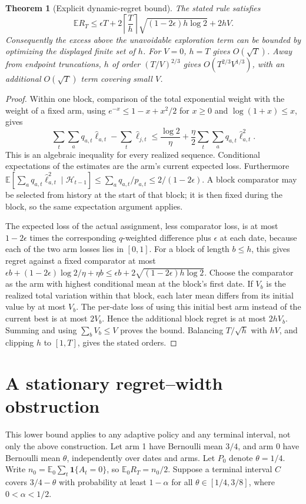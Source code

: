 \documentclass[11pt]{article}
\newtheorem{theorem}{Theorem}
\theoremstyle{remark}\newtheorem{remark}[theorem]{Remark}
\newcommand{\E}{\mathbb E}
\newcommand{\ind}{\mathbf 1}
\begin{document}
\begin{theorem}[Explicit dynamic-regret bound]
The stated rule satisfies
\[
 \E R_T\le\epsilon T+
 2\left\lceil\frac Th\right\rceil\sqrt{(1-2\epsilon)h\log2}
 +2hV.
\]
Consequently the excess above the unavoidable exploration term can be bounded by optimizing the displayed finite set of $h$. For $V=0$, $h=T$ gives $O(\sqrt T)$. Away from endpoint truncations, $h$ of order $(T/V)^{2/3}$ gives $O(T^{2/3}V^{1/3})$, with an additional $O(\sqrt T)$ term covering small $V$.
\end{theorem}
\begin{proof}
Within one block, comparison of the total exponential weight with the weight of a fixed arm, using $e^{-x}\le1-x+x^2/2$ for $x\ge0$ and $\log(1+x)\le x$, gives
\[
 \sum_t\sum_a q_{a,t}\widehat\ell_{a,t}
 -\sum_t\widehat\ell_{j,t}
 \le\frac{\log2}{\eta}
 +\frac\eta2\sum_t\sum_aq_{a,t}\widehat\ell_{a,t}^2.
\]
This is an algebraic inequality for every realized sequence. Conditional expectations of the estimates are the arm's current expected loss. Furthermore
$\E[\sum_aq_{a,t}\widehat\ell_{a,t}^2\mid\mathcal H_{t-1}]
\le\sum_aq_{a,t}/p_{a,t}\le2/(1-2\epsilon)$.
A block comparator may be selected from history at the start of that block; it is then fixed during the block, so the same expectation argument applies.

The expected loss of the actual assignment, less comparator loss, is at most $1-2\epsilon$ times the corresponding $q$-weighted difference plus $\epsilon$ at each date, because each of the two arm losses lies in $[0,1]$. For a block of length $b\le h$, this gives regret against a fixed comparator at most
$\epsilon b+(1-2\epsilon)\log2/\eta+\eta b
\le\epsilon b+2\sqrt{(1-2\epsilon)h\log2}$.
Choose the comparator as the arm with highest conditional mean at the block's first date. If $V_b$ is the realized total variation within that block, each later mean differs from its initial value by at most $V_b$. The per-date loss of using this initial best arm instead of the current best is at most $2V_b$. Hence the additional block regret is at most $2hV_b$. Summing and using $\sum_bV_b\le V$ proves the bound. Balancing $T/\sqrt h$ with $hV$, and clipping $h$ to $[1,T]$, gives the stated orders.
\end{proof}

\section*{A stationary regret--width obstruction}
This lower bound applies to any adaptive policy and any terminal interval, not only the above construction. Let arm 1 have Bernoulli mean $3/4$, and arm 0 have Bernoulli mean $\theta$, independently over dates and arms. Let $P_0$ denote $\theta=1/4$. Write $n_0=\E_0\sum_t\ind\{A_t=0\}$, so $\E_0 R_T=n_0/2$. Suppose a terminal interval $C$ covers $3/4-\theta$ with probability at least $1-\alpha$ for all $\theta\in[1/4,3/8]$, where $0<\alpha<1/2$.
\end{document}
